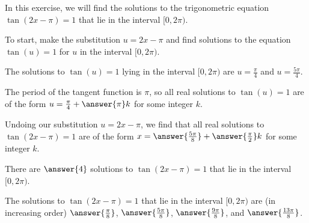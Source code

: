 \documentclass{ximera}
\author{Kenneth Berglund}
\begin{document}
\licenseSZ
In this exercise, we will find the solutions to the trigonometric equation $\tan(2x - \pi) = 1$ that lie in the interval $[0, 2\pi)$.

To start, make the substitution $u = 2x - \pi$ and find solutions to the equation $\tan(u) = 1$ for $u$ in the interval $[0, 2\pi)$. 

The solutions to $\tan(u) = 1$ lying in the interval $[0, 2\pi)$ are $u = \frac{\pi}{4}$ and $u = \frac{5\pi}{4}$.

\begin{exercise}
The period of the tangent function is $\pi$, so all real solutions to $\tan(u) = 1$ are of the form $u = \frac{\pi}{4} + \answer{\pi}k$ for some integer $k$. 

\begin{exercise}
Undoing our substitution $u = 2x - \pi$, we find that all real solutions to $\tan(2x-\pi) = 1$ are of the form $x = \answer{\frac{5\pi}{8}} + \answer{\frac{\pi}{2}}k$ for some integer $k$.

\begin{exercise}
There are $\answer{4}$ solutions to $\tan(2x - \pi) = 1$ that lie in the interval $[0, 2\pi)$.

\begin{exercise}
The solutions to $\tan(2x - \pi) = 1$ that lie in the interval $[0, 2\pi)$ are (in increasing order) $\answer{\frac{\pi}{8}}$, $\answer{\frac{5\pi}{8}}$, $\answer{\frac{9\pi}{8}}$, and $\answer{\frac{13\pi}{8}}$.


\end{exercise}
\end{exercise}
\end{exercise}
\end{exercise}
\end{document}

